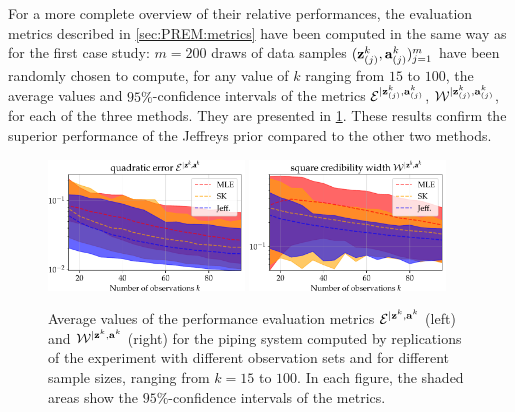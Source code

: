 For a more complete overview of their relative performances, the evaluation metrics described in \cref{sec:PREM:metrics}  have been computed in the same way as for the first case study: $m=200$ draws of data samples $(\mathbf{z}^k_{(j)},\mathbf{a}^k_{(j)})_{j=1}^m$ have been randomly chosen to compute, for any value of $k$ ranging from $15$ to $100$, the average values and $95\%$-confidence intervals of the metrics $\mathcal{E}^{|\mathbf{z}^k_{(j)},\mathbf{a}^k_{(j)}}$, $\mathcal{W}^{|\mathbf{z}^k_{(j)},\mathbf{a}^k_{(j)}}$, for each of the three methods. They are presented in \cref{fig:ASG-errors}. These results confirm the superior performance of the Jeffreys prior compared to the other two methods.    





\begin{figure}[h!]
    \centering%
    \includegraphics[width=5.2cm]{figures/PREM/asg/errElog.pdf}\hspace*{0.5cm}
    \includegraphics[width=5.2cm]{figures/PREM/asg/errWlog.pdf}
    \caption{%
    Average values of the performance evaluation metrics $\mathcal{E}^{|\mathbf{z}^k,\mathbf{a}^k}$ (left) and $\mathcal{W}^{|\mathbf{z}^k,\mathbf{a}^k}$ (right) for the piping system computed by replications of the experiment with different observation sets and for different sample sizes, ranging from $k=15$ to $100$. In each figure, the shaded areas show the $95\%$-confidence intervals of the metrics.}
    \label{fig:ASG-errors}
\end{figure}



